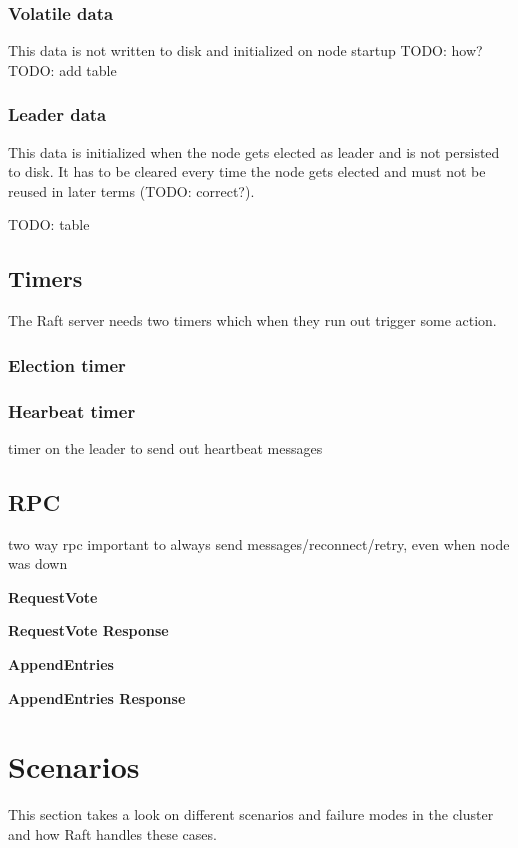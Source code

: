 \subsubsection*{Volatile data}

This data is not written to disk and initialized on node startup
TODO: how?
TODO: add table

\subsubsection*{Leader data}

This data is initialized when the node gets elected as leader and is not persisted to disk.
It has to be cleared every time the node gets elected and must not be reused in later terms (TODO: correct?).

TODO: table


\subsection{Timers}
The Raft server needs two timers which when they run out trigger some action.

\subsubsection*{Election timer}


\subsubsection*{Hearbeat timer}
timer on the leader to send out heartbeat messages

\subsection{RPC}

two way rpc
important to always send messages/reconnect/retry, even when node was down

\textbf{RequestVote}

\textbf{RequestVote Response}

\textbf{AppendEntries}

\textbf{AppendEntries Response}

\section{Scenarios}
This section takes a look on different scenarios and failure modes in the cluster and how Raft handles these cases.

